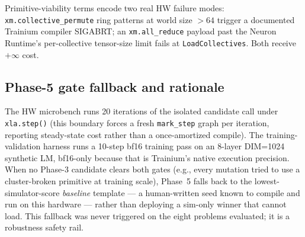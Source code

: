 Primitive-viability terms encode two real HW failure modes:
\texttt{xm.collective\_permute} ring patterns at world size $>64$
trigger a documented Trainium compiler SIGABRT; an
\texttt{xm.all\_reduce} payload past the Neuron Runtime's
per-collective tensor-size limit fails at
\texttt{LoadCollectives}. Both receive $+\infty$ cost.

\subsection{Phase-5 gate fallback and rationale}
\label{sec:cost-impl-phase5}

The HW microbench runs 20 iterations of the isolated candidate
call under \texttt{xla.step()} (this boundary forces a fresh
\texttt{mark\_step} graph per iteration, reporting steady-state
cost rather than a once-amortized compile). The training-validation
harness runs a 10-step bf16 training pass on an 8-layer DIM=1024
synthetic LM, bf16-only because that is Trainium's native
execution precision. When no Phase-3 candidate clears both gates
(e.g., every mutation tried to use a cluster-broken primitive at
training scale), Phase~5 falls back to the lowest-simulator-score
\emph{baseline} template --- a human-written seed known to compile
and run on this hardware --- rather than deploying a sim-only
winner that cannot load. This fallback was never triggered on the
eight problems evaluated; it is a robustness safety rail.


